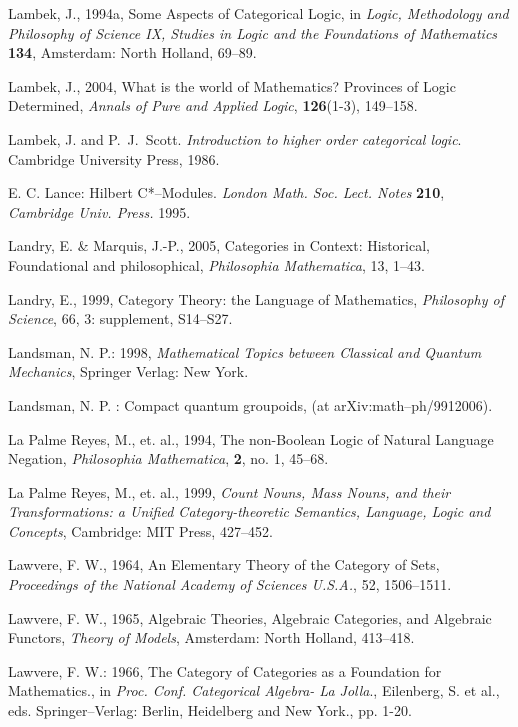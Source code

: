 \documentclass[12pt]{article}
\theoremstyle{plain}
\theoremstyle{definition}
\numberwithin{equation}{section}
\begin{document}
\begin{thebibliography}{199}
Lambek, J., 1994a, Some Aspects of Categorical Logic, in {\em Logic, Methodology and Philosophy of Science IX, Studies in Logic and the Foundations of Mathematics} \textbf{134}, Amsterdam: North Holland, 69--89. 
 
Lambek, J., 2004, What is the world of Mathematics? Provinces of Logic Determined, {\em Annals of Pure and Applied Logic}, \textbf{126}(1-3), 149--158. 

Lambek, J. and P.~J.~Scott. {\em Introduction to higher order categorical logic}. Cambridge University Press, 1986.

E. C. Lance: Hilbert C*--Modules. \emph{London Math. Soc. Lect. Notes} \textbf{210}, \emph{Cambridge Univ. Press.} 1995.

Landry, E. \& Marquis, J.-P., 2005, Categories in Context: Historical, Foundational and philosophical, 
{\em Philosophia Mathematica}, 13, 1--43.  

Landry, E., 1999, Category Theory: the Language of Mathematics, {\em Philosophy of Science}, 66, 3: supplement, S14--S27. 

Landsman, N. P.: 1998, \emph{Mathematical Topics between Classical and Quantum Mechanics}, Springer Verlag: New York.

Landsman, N. P. : Compact quantum groupoids, (at arXiv:math--ph/9912006).

La Palme Reyes, M., et. al., 1994, The non-Boolean Logic of Natural Language Negation, 
{\em Philosophia Mathematica}, \textbf{2}, no. 1, 45--68.

La Palme Reyes, M., et. al., 1999, {\em Count Nouns, Mass Nouns, and their Transformations: a Unified Category-theoretic Semantics, Language, Logic and Concepts}, Cambridge: MIT Press, 427--452.  
 
Lawvere, F. W., 1964, An Elementary Theory of the Category of Sets, {\em Proceedings of the National Academy of Sciences U.S.A.}, 52, 1506--1511. 

Lawvere, F. W., 1965, Algebraic Theories, Algebraic Categories, and Algebraic Functors, {\em Theory of Models}, Amsterdam: North Holland, 413--418.  

Lawvere, F. W.: 1966, The Category of Categories as a Foundation for Mathematics., in
\emph{Proc. Conf. Categorical Algebra- La Jolla}., Eilenberg, S. et al., eds. Springer--Verlag:
Berlin, Heidelberg and New York., pp. 1-20.


\end{thebibliography}
\end{document}
